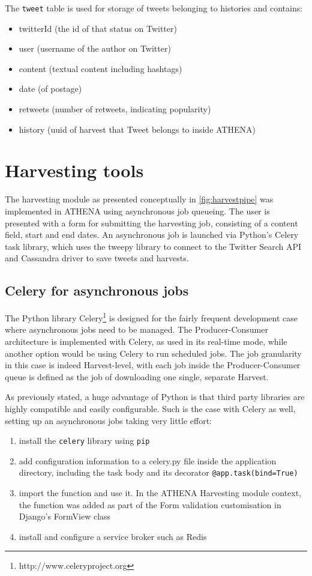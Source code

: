 The \texttt{tweet} table is used for storage of tweets belonging to histories and contains:

\begin{itemize}
\item twitterId (the id of that status on Twitter)
\item user (username of the author on Twitter)
\item content (textual content including hashtags)
\item date (of postage)
\item retweets (number of retweets, indicating popularity)
\item history (uuid of harvest that Tweet belongs to inside ATHENA)
\end{itemize}

\section{Harvesting tools}
The harvesting module as presented conceptually in \ref{fig:harvestpipe} was implemented in ATHENA using asynchronous job queueing. The user is presented with a form for submitting the harvesting job, consisting of a content field, start and end dates. An asynchronous job is launched via Python's Celery task library, which uses the tweepy library to connect to the Twitter Search API and Cassandra driver to save tweets and harvests.

\subsection{Celery for asynchronous jobs}
The Python library Celery\footnote{http://www.celeryproject.org} is designed for the fairly frequent development case where asynchronous jobs need to be managed. The Producer-Consumer architecture is implemented with Celery, as used in its real-time mode, while another option would be using Celery to run scheduled jobs. The job granularity in this case is indeed Harvest-level, with each job inside the Producer-Consumer queue is defined as the job of downloading one single, separate Harvest.

As previously stated, a huge advantage of Python is that third party libraries are highly compatible and easily configurable. Such is the case with Celery as well, setting up an asynchronous jobs taking very little effort:

\begin{enumerate}
\item install the \texttt{celery} library using \texttt{pip}
\item add configuration information to a celery.py file inside the application directory, including the task body and its decorator \texttt{@app.task(bind=True)}
\item import the function and use it. In the ATHENA Harvesting module context, the function was added as part of the Form validation customisation in Django's FormView class
\item install and configure a service broker such as Redis
\end{enumerate}

